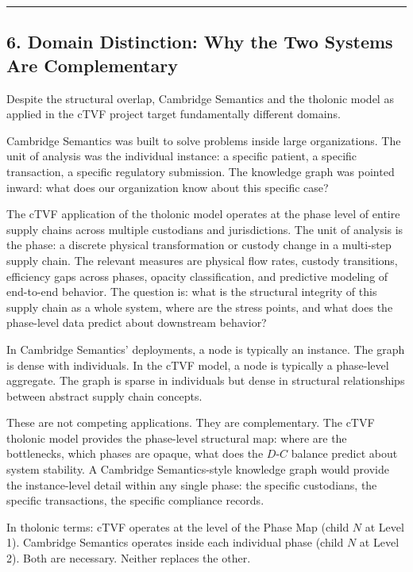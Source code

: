 \documentclass[
  11pt,
  letterpaper,
]{article}
\begin{document}
\begin{center}\rule{0.5\linewidth}{0.5pt}\end{center}

\subsection{6. Domain Distinction: Why the Two Systems Are
Complementary}\label{domain-distinction-why-the-two-systems-are-complementary}

Despite the structural overlap, Cambridge Semantics and the tholonic
model as applied in the cTVF project target fundamentally different
domains.

Cambridge Semantics was built to solve problems inside large
organizations. The unit of analysis was the individual instance: a
specific patient, a specific transaction, a specific regulatory
submission. The knowledge graph was pointed inward: what does our
organization know about this specific case?

The cTVF application of the tholonic model operates at the phase level
of entire supply chains across multiple custodians and jurisdictions.
The unit of analysis is the phase: a discrete physical transformation or
custody change in a multi-step supply chain. The relevant measures are
physical flow rates, custody transitions, efficiency gaps across phases,
opacity classification, and predictive modeling of end-to-end behavior.
The question is: what is the structural integrity of this supply chain
as a whole system, where are the stress points, and what does the
phase-level data predict about downstream behavior?

In Cambridge Semantics' deployments, a node is typically an instance.
The graph is dense with individuals. In the cTVF model, a node is
typically a phase-level aggregate. The graph is sparse in individuals
but dense in structural relationships between abstract supply chain
concepts.

These are not competing applications. They are complementary. The cTVF
tholonic model provides the phase-level structural map: where are the
bottlenecks, which phases are opaque, what does the \(D\)-\(C\) balance
predict about system stability. A Cambridge Semantics-style knowledge
graph would provide the instance-level detail within any single phase:
the specific custodians, the specific transactions, the specific
compliance records.

In tholonic terms: cTVF operates at the level of the Phase Map (child
\(N\) at Level 1). Cambridge Semantics operates inside each individual
phase (child \(N\) at Level 2). Both are necessary. Neither replaces the
other.
\end{document}
